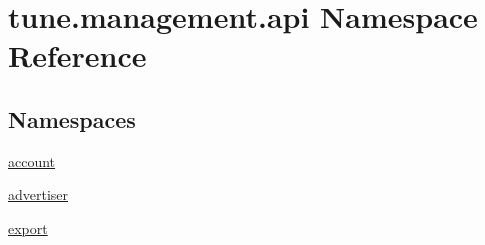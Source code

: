 \hypertarget{namespacetune_1_1management_1_1api}{\section{tune.\-management.\-api Namespace Reference}
\label{namespacetune_1_1management_1_1api}
}
\subsection*{Namespaces}
\begin{DoxyCompactItemize}
\item 
\hyperlink{namespacetune_1_1management_1_1api_1_1account}{account}
\item 
\hyperlink{namespacetune_1_1management_1_1api_1_1advertiser}{advertiser}
\item 
\hyperlink{namespacetune_1_1management_1_1api_1_1export}{export}
\end{DoxyCompactItemize}
